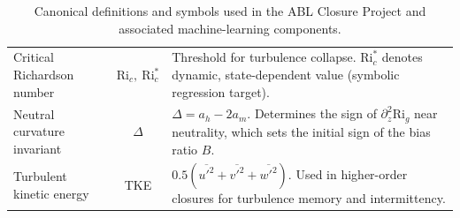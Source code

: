 \begin{table}[t]
\begin{tabularx}{\linewidth}{l c X}
Critical Richardson number
 & $\mathrm{Ri}_c,\ \mathrm{Ri}_c^\ast$
 & Threshold for turbulence collapse. $\mathrm{Ri}_c^\ast$ denotes dynamic, state-dependent value (symbolic regression target). \\

Neutral curvature invariant
 & $\Delta$
 & $\Delta = a_h - 2 a_m$. Determines the sign of $\partial_z^2 \mathrm{Ri}_g$ near neutrality, which sets the initial sign of the bias ratio $B$. \\

Turbulent kinetic energy
 & TKE
 & $0.5(\overline{u'^2}+\overline{v'^2}+\overline{w'^2})$. Used in higher-order closures for turbulence memory and intermittency. \\

\hline
\end{tabularx}
\caption{Canonical definitions and symbols used in the ABL Closure Project and associated machine-learning components.}
\label{tab:abl-glossary}
\end{table}